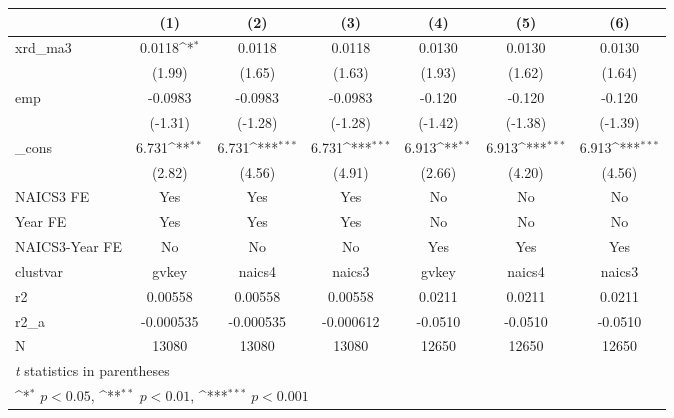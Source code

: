 {
\def\sym#1{\ifmmode^{#1}\else\(^{#1}\)\fi}
\begin{tabular}{l*{6}{c}}
\hline\hline
            &\multicolumn{1}{c}{(1)}         &\multicolumn{1}{c}{(2)}         &\multicolumn{1}{c}{(3)}         &\multicolumn{1}{c}{(4)}         &\multicolumn{1}{c}{(5)}         &\multicolumn{1}{c}{(6)}         \\
\hline
xrd\_ma3     &      0.0118\sym{*}  &      0.0118         &      0.0118         &      0.0130         &      0.0130         &      0.0130         \\
            &      (1.99)         &      (1.65)         &      (1.63)         &      (1.93)         &      (1.62)         &      (1.64)         \\
[1em]
emp         &     -0.0983         &     -0.0983         &     -0.0983         &      -0.120         &      -0.120         &      -0.120         \\
            &     (-1.31)         &     (-1.28)         &     (-1.28)         &     (-1.42)         &     (-1.38)         &     (-1.39)         \\
[1em]
\_cons      &       6.731\sym{**} &       6.731\sym{***}&       6.731\sym{***}&       6.913\sym{**} &       6.913\sym{***}&       6.913\sym{***}\\
            &      (2.82)         &      (4.56)         &      (4.91)         &      (2.66)         &      (4.20)         &      (4.56)         \\
[1em]
NAICS3 FE   &         Yes         &         Yes         &         Yes         &          No         &          No         &          No         \\
[1em]
Year FE     &         Yes         &         Yes         &         Yes         &          No         &          No         &          No         \\
[1em]
NAICS3-Year FE&          No         &          No         &          No         &         Yes         &         Yes         &         Yes         \\
\hline
clustvar    &       gvkey         &      naics4         &      naics3         &       gvkey         &      naics4         &      naics3         \\
r2          &     0.00558         &     0.00558         &     0.00558         &      0.0211         &      0.0211         &      0.0211         \\
r2\_a        &   -0.000535         &   -0.000535         &   -0.000612         &     -0.0510         &     -0.0510         &     -0.0510         \\
N           &       13080         &       13080         &       13080         &       12650         &       12650         &       12650         \\
\hline\hline
\multicolumn{7}{l}{\footnotesize \textit{t} statistics in parentheses}\\
\multicolumn{7}{l}{\footnotesize \sym{*} \(p<0.05\), \sym{**} \(p<0.01\), \sym{***} \(p<0.001\)}\\
\end{tabular}
}
